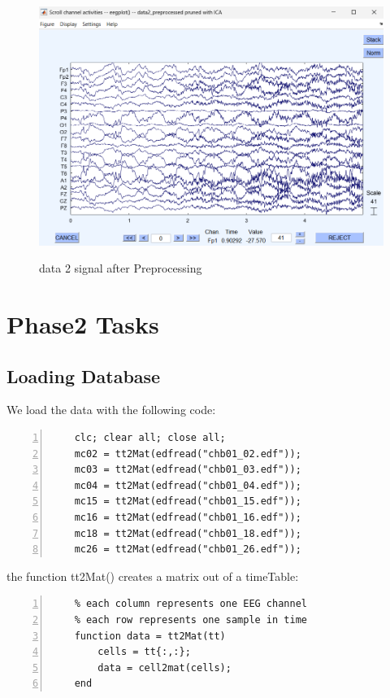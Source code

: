 \documentclass[11pt]{article}
\begin{document}
\begin{figure}[H]
    \begin{center}
        \includegraphics[scale=0.55]{Fig/channel_activity_data2.png}
        \label{fig:data2Activity}
        \caption{data 2 signal after Preprocessing}
    \end{center}
\end{figure}


\section{Phase2 Tasks}
\subsection{Loading Database}
We load the data with the following code: \\

\begin{lstlisting}[backgroundcolor=\color{lbcolor}, frame=single,
    numbers=left,style=Matlab-editor]
    %% Loading data and setting 
    clc; clear all; close all;
    mc02 = tt2Mat(edfread("chb01_02.edf"));
    mc03 = tt2Mat(edfread("chb01_03.edf"));
    mc04 = tt2Mat(edfread("chb01_04.edf"));
    mc15 = tt2Mat(edfread("chb01_15.edf"));
    mc16 = tt2Mat(edfread("chb01_16.edf"));
    mc18 = tt2Mat(edfread("chb01_18.edf"));
    mc26 = tt2Mat(edfread("chb01_26.edf"));
\end{lstlisting}

the function tt2Mat() creates a matrix out of a timeTable: \\  

\begin{lstlisting}[backgroundcolor=\color{lbcolor}, frame=single,
    numbers=left,style=Matlab-editor]
    % the following function converts a timeTable to Matrix
    % each column represents one EEG channel
    % each row represents one sample in time
    function data = tt2Mat(tt)
        cells = tt{:,:};
        data = cell2mat(cells);
    end
\end{lstlisting}
\end{document}
